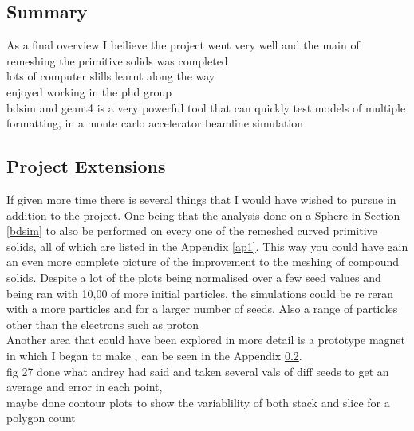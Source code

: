 \documentclass[12pt,a4paper]{article}
\begin{document}
\subsection{Summary}
As a final overview I beilieve the project went very well and the main of remeshing the primitive solids was completed\\
lots of computer slills learnt along the way\\
enjoyed working in the phd group\\
bdsim and geant4 is a very powerful tool that can quickly test models of multiple formatting, in a monte carlo accelerator beamline simulation


\subsection{Project Extensions}
If given more time there is several things that I  would have wished to pursue in addition to the project. One being that the analysis done on a Sphere in Section \ref{bdsim} to also be performed on every one of the remeshed curved primitive solids, all of which are listed in the Appendix \ref{ap1}. This way you could have gain an even more complete picture of the improvement to the meshing of compound solids. Despite a lot of the plots being normalised over a few seed values and being ran with 10,00 of more initial particles, the simulations could be re reran with a more particles and for a larger number of seeds. Also a range of particles other than the electrons such as proton\\
Another area that could have been explored in more detail is a prototype magnet in which I began to make , can be seen in the Appendix \ref{}.\\
fig 27 done what andrey had said and taken several vals of diff seeds to get an average and error in each point, \\
maybe done contour plots to show the variablility of both stack and slice for a polygon count\\


\newpage
\newpage
\footnotesize



\normalsize
\appendix
\setcounter{figure}{0} 
\end{document}
